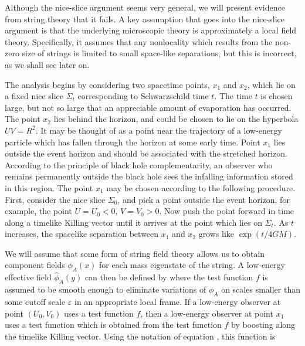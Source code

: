 
Although the nice-slice argument seems very general, we will present
evidence from string theory that it fails. A key
assumption that goes into the nice-slice argument is that
the underlying microscopic theory is
approximately a local field theory.  Specifically, it assumes that
any nonlocality which results from the non-zero size of strings is
limited to small space-like separations, but this is incorrect, as we
shall see later on.

The analysis begins by considering two spacetime points, $x_1$ and
$x_2$, which lie on a fixed nice slice $\Sigma_t$ corresponding to
Schwarzschild time $t$.  The time $t$ is chosen large, but not so
large that an appreciable amount of evaporation has occurred.  The
point $x_2$ lies behind the horizon, and could be chosen to lie on
the hyperbola $UV=R^2$.  It may be thought of as a point near the
trajectory of a low-energy particle which has fallen through the
horizon at some early time.  Point $x_1$ lies outside the event
horizon and should be associated with the stretched horizon.
According to the principle of black hole complementarity, an
observer who remains permanently outside the black
hole sees the
infalling information stored in this region.  The point $x_1$ may be
chosen according to the following
procedure.
First, consider the nice slice $\Sigma_0$, and pick a point outside
the event horizon, for example, the point $U = U_0 < 0$, $V = V_0 >
0$.  Now push the point forward in time along a timelike Killing
vector until it arrives at the point
\eqn{}
which lies on $\Sigma_t$.  As $t$ increases, the spacelike separation
between $x_1$ and $x_2$ grows like $\exp (t/4GM)$.

We will assume that some form of string field theory allows us to
obtain component fields $\phi_A(x)$ for each mass eigenstate of the
string.  A low-energy effective field ${\hat \phi}_A(y)$ can then be
defined by
\eqn{}
where the test function $f$ is assumed to be smooth enough to
eliminate variations of $\phi_A$ on scales smaller than some cutoff
scale $\varepsilon$ in an appropriate local frame.  If a low-energy
observer at point $(U_0,V_0)$ uses a test function $f$, then a
low-energy observer at point $x_1$ uses a test function which is
obtained
from the test function $f$ by boosting along the timelike
Killing
vector.  Using the notation of equation \newpoint , this function is
\eqn{}

